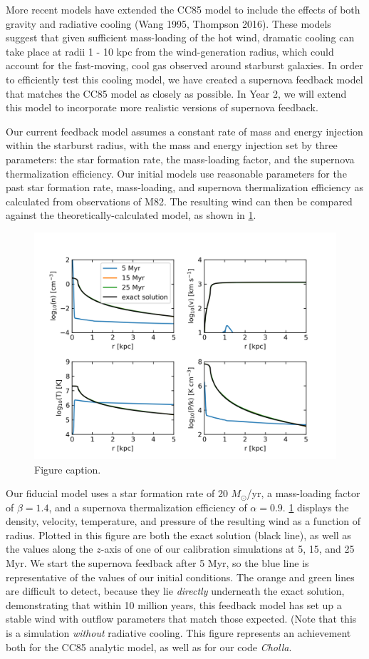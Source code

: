 \documentclass[11pt,letterpaper,english]{article}
\begin{document}
More recent models have extended the CC85 model to include the effects of both gravity and radiative cooling (Wang 1995, Thompson 2016). These models suggest that given sufficient mass-loading of the hot wind, dramatic cooling can take place at radii 1 - 10 kpc from the wind-generation radius, which could account for the fast-moving, cool gas observed around starburst galaxies. In order to efficiently test this cooling model, we have created a supernova feedback model that matches the CC85 model as closely as possible. In Year 2, we will extend this model to incorporate more realistic versions of supernova feedback.

Our current feedback model assumes a constant rate of mass and energy injection within the starburst radius, with the mass and energy injection set by three parameters: the star formation rate, the mass-loading factor, and the supernova thermalization efficiency. Our initial models use reasonable parameters for the past star formation rate, mass-loading, and supernova thermalization efficiency as calculated from observations of M82. The resulting wind can then be compared against the theoretically-calculated model, as shown in \ref{fig:CC85}.

\begin{figure}[h]
\centering
\includegraphics[width=0.8\linewidth]{CC85.png}
\caption{Figure caption.}
\label{fig:CC85}
\end{figure}

Our fiducial model uses a star formation rate of 20 $M_\odot$/yr, a mass-loading factor of $\beta = 1.4$, and a supernova thermalization efficiency of $\alpha = 0.9$. \ref{fig:CC85} displays the density, velocity, temperature, and pressure of the resulting wind as a function of radius. Plotted in this figure are both the exact solution (black line), as well as the values along the $z$-axis of one of our calibration simulations at 5, 15, and 25 Myr. We start the supernova feedback after 5 Myr, so the blue line is representative of the values of our initial conditions. The orange and green lines are difficult to detect, because they lie \textit{directly} underneath the exact solution, demonstrating that within 10 million years, this feedback model has set up a stable wind with outflow parameters that match those expected. (Note that this is a simulation \textit{without} radiative cooling. This figure represents an achievement both for the CC85 analytic model, as well as for our code \textit{Cholla}.
\end{document}
